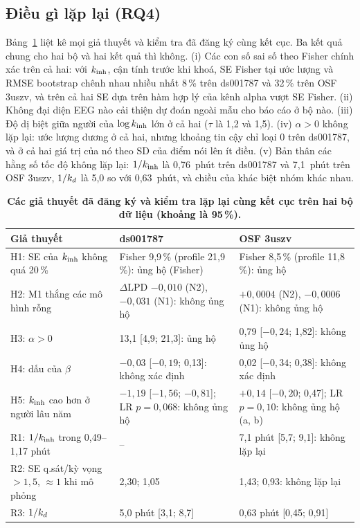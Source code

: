 \subsection{Điều gì lặp lại (RQ4)}
Bảng~\ref{tab:tests} liệt kê mọi giả thuyết và kiểm tra đã đăng ký cùng kết cục. Ba kết quả chung cho hai bộ và hai kết quả thì không. (i) Các con số sai số theo Fisher chính xác trên cả hai: với $k_{\mathrm{inh}}$, cận tính trước khi khoá, SE Fisher tại ước lượng và RMSE bootstrap chênh nhau nhiều nhất 8\,\% trên ds001787 và 32\,\% trên OSF 3uszv, và trên cả hai SE dựa trên hàm hợp lý của kênh alpha vượt SE Fisher. (ii) Không đại diện EEG nào cải thiện dự đoán ngoài mẫu cho báo cáo ở bộ nào. (iii) Độ dị biệt giữa người của $\log k_{\mathrm{inh}}$ lớn ở cả hai ($\tau$ là 1,2 và 1,5). (iv) $\alpha>0$ không lặp lại: ước lượng dương ở cả hai, nhưng khoảng tin cậy chỉ loại 0 trên ds001787, và ở cả hai giá trị của nó theo SD của điểm nói lên ít điều. (v) Bản thân các hằng số tốc độ không lặp lại: $1/k_{\mathrm{inh}}$ là 0,76~phút trên ds001787 và 7,1~phút trên OSF 3uszv, $1/k_{d}$ là 5,0 so với 0,63~phút, và chiều của khác biệt nhóm khác nhau.

\begin{table}[t]
\caption{\textbf{Các giả thuyết đã đăng ký và kiểm tra lặp lại cùng kết cục trên hai bộ dữ liệu (khoảng là 95\,\%).}}
\label{tab:tests}
\centering\scriptsize
\setlength{\tabcolsep}{3pt}
\begin{tabular}{lll}
\toprule
Giả thuyết & ds001787 & OSF 3uszv \\
\midrule
H1: SE của $k_{\mathrm{inh}}$ không quá 20\,\% & Fisher 9,9\,\% (profile 21,9\,\%): ủng hộ (Fisher) & Fisher 8,5\,\% (profile 11,8\,\%): ủng hộ \\
H2: M1 thắng các mô hình rỗng & $\Delta$LPD $-0{,}010$ (N2), $-0{,}031$ (N1): không ủng hộ & $+0{,}0004$ (N2), $-0{,}0006$ (N1): không ủng hộ \\
H3: $\alpha>0$ & 13,1 [4,9; 21,3]: ủng hộ & 0,79 [$-0{,}24$; 1,82]: không ủng hộ \\
H4: dấu của $\beta$ & $-0{,}03$ [$-0{,}19$; 0,13]: không xác định & 0,02 [$-0{,}34$; 0,38]: không xác định \\
H5: $k_{\mathrm{inh}}$ cao hơn ở người lâu năm & $-1{,}19$ [$-1{,}56$; $-0{,}81$]; LR $p=0{,}068$: không ủng hộ & $+0{,}14$ [$-0{,}20$; 0,47]; LR $p=0{,}10$: không ủng hộ (a, b) \\
R1: $1/k_{\mathrm{inh}}$ trong 0,49--1,17 phút & -- & 7,1 phút [5,7; 9,1]: không lặp lại \\
R2: SE q.sát/kỳ vọng $>1{,}5$, $\approx1$ khi mô phỏng & 2,30; 1,05 & 1,43; 0,93: không lặp lại \\
R3: $1/k_{d}$ & 5,0 phút [3,1; 8,7] & 0,63 phút [0,45; 0,91] \\
\bottomrule
\end{tabular}
\end{table}

